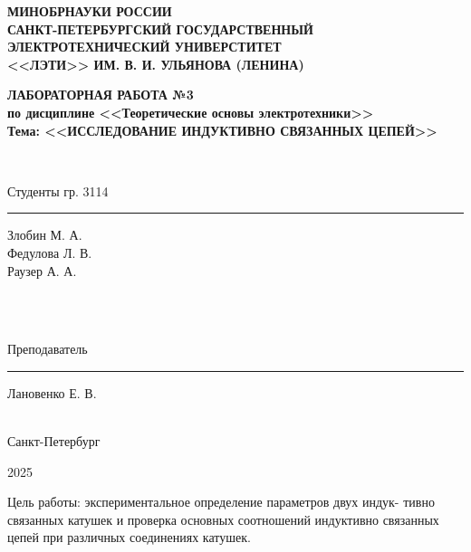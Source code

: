 \documentclass[a4paper,14pt ]{article} %
\begin{document}
 
\begin{titlepage}
    \begin{center}
        {\bf  МИНОБРНАУКИ РОССИИ\\
        САНКТ-ПЕТЕРБУРГСКИЙ ГОСУДАРСТВЕННЫЙ\\
        ЭЛЕКТРОТЕХНИЧЕСКИЙ УНИВЕРСТИТЕТ\\
        <<ЛЭТИ>> ИМ. В. И. УЛЬЯНОВА (ЛЕНИНА)\\
    
        }
    \end{center}
    \vfill
        {
        \begin{center}
            \bfseries
            ЛАБОРАТОРНАЯ РАБОТА №3\\
            по дисциплине <<Теоретические основы электротехники>>\\
            Тема: <<ИССЛЕДОВАНИЕ ИНДУКТИВНО СВЯЗАННЫХ ЦЕПЕЙ>>\\
        \end{center}
        }
        \
    \vfill
        {\noindent\parbox{4cm}{Студенты гр. 3114}  \hfill \parbox{3cm}{\rule{3cm}{0.15mm}} \hfill \parbox{4cm}{\raggedleft Злобин М. А.\\ Федулова Л. В. \\ Раузер А. А.}} \\\\
        \parbox{4cm}{Преподаватель} \hfill \parbox{3cm}{\rule{3cm}{0.15mm}} \hfill \parbox{4cm}{\raggedleft Лановенко Е. В.} \\ 
        \center Санкт-Петербург
        
        2025
\end{titlepage}

Цель работы: экспериментальное определение параметров двух индук-
тивно связанных катушек и проверка основных соотношений индуктивно
связанных цепей при различных соединениях катушек.
\end{document}
